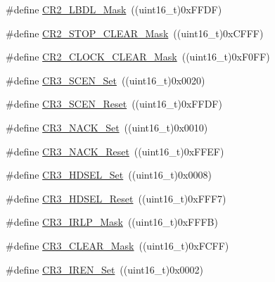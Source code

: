 \begin{DoxyCompactItemize}
\item 
\#define \mbox{\hyperlink{group___u_s_a_r_t___private___defines_ga9b365a89de44809a52895090e9050646}{C\+R2\+\_\+\+L\+B\+D\+L\+\_\+\+Mask}}~((uint16\+\_\+t)0x\+F\+F\+D\+F)
\item 
\#define \mbox{\hyperlink{group___u_s_a_r_t___private___defines_ga8a2294276016f30cb361a7f54ad07cd4}{C\+R2\+\_\+\+S\+T\+O\+P\+\_\+\+C\+L\+E\+A\+R\+\_\+\+Mask}}~((uint16\+\_\+t)0x\+C\+F\+F\+F)
\item 
\#define \mbox{\hyperlink{group___u_s_a_r_t___private___defines_ga846e1873279b2b0798cc34d76bd80592}{C\+R2\+\_\+\+C\+L\+O\+C\+K\+\_\+\+C\+L\+E\+A\+R\+\_\+\+Mask}}~((uint16\+\_\+t)0x\+F0\+F\+F)
\item 
\#define \mbox{\hyperlink{group___u_s_a_r_t___private___defines_gab47df7b36b4f1315953f6aa45de2fb61}{C\+R3\+\_\+\+S\+C\+E\+N\+\_\+\+Set}}~((uint16\+\_\+t)0x0020)
\item 
\#define \mbox{\hyperlink{group___u_s_a_r_t___private___defines_ga294c473dc7f8ff3e9cbaa0675c8c75f3}{C\+R3\+\_\+\+S\+C\+E\+N\+\_\+\+Reset}}~((uint16\+\_\+t)0x\+F\+F\+D\+F)
\item 
\#define \mbox{\hyperlink{group___u_s_a_r_t___private___defines_ga950cc9f7251709854754add7d9aaca60}{C\+R3\+\_\+\+N\+A\+C\+K\+\_\+\+Set}}~((uint16\+\_\+t)0x0010)
\item 
\#define \mbox{\hyperlink{group___u_s_a_r_t___private___defines_gabed0cac273ff4faf009e8c35243c1e10}{C\+R3\+\_\+\+N\+A\+C\+K\+\_\+\+Reset}}~((uint16\+\_\+t)0x\+F\+F\+E\+F)
\item 
\#define \mbox{\hyperlink{group___u_s_a_r_t___private___defines_ga0c5c30ea9777d0c8c6f1b5ff85dfca3c}{C\+R3\+\_\+\+H\+D\+S\+E\+L\+\_\+\+Set}}~((uint16\+\_\+t)0x0008)
\item 
\#define \mbox{\hyperlink{group___u_s_a_r_t___private___defines_ga762c72448ba24f3487dfa457a8dcc9fc}{C\+R3\+\_\+\+H\+D\+S\+E\+L\+\_\+\+Reset}}~((uint16\+\_\+t)0x\+F\+F\+F7)
\item 
\#define \mbox{\hyperlink{group___u_s_a_r_t___private___defines_gaea5d8d002a34c3a587719533db2c17f9}{C\+R3\+\_\+\+I\+R\+L\+P\+\_\+\+Mask}}~((uint16\+\_\+t)0x\+F\+F\+F\+B)
\item 
\#define \mbox{\hyperlink{group___u_s_a_r_t___private___defines_ga085e8ef6bc8f5de45c5be95971715f7f}{C\+R3\+\_\+\+C\+L\+E\+A\+R\+\_\+\+Mask}}~((uint16\+\_\+t)0x\+F\+C\+F\+F)
\item 
\#define \mbox{\hyperlink{group___u_s_a_r_t___private___defines_gad5dd1d08f3836f9a3c3f3cc0c66a8b8f}{C\+R3\+\_\+\+I\+R\+E\+N\+\_\+\+Set}}~((uint16\+\_\+t)0x0002)

\end{DoxyCompactItemize}
